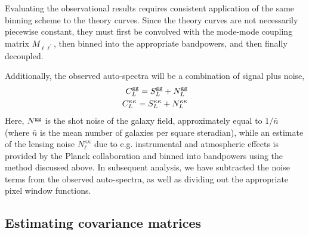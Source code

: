 Evaluating the observational results requires consistent application of the same binning scheme to the theory curves. Since the theory curves are not necessarily piecewise constant, they must first be convolved with the mode-mode coupling matrix $M_{\ell\ell^{\prime}}$, then binned into the appropriate bandpowers, and then finally decoupled.

Additionally, the observed auto-spectra will be a combination of signal plus noise,
\begin{align}
    C_{L}^{\rm gg} = S_{L}^{\rm gg} + N_{L}^{\rm gg} \\
    C_{L}^{\kappa \kappa} = S_{L}^{\kappa \kappa} + N_{L}^{\kappa \kappa}
\end{align}
Here, $N^{\rm gg}$ is the shot noise of the galaxy field, approximately equal to $1/\bar{n}$ (where $\bar{n}$ is the mean number of galaxies per square steradian), while an estimate of the lensing noise $N^{\kappa \kappa}_{\ell}$ due to e.g. instrumental and atmospheric effects is provided by the Planck collaboration and binned into bandpowers using the method discussed above. In subsequent analysis, we have subtracted the noise terms from the observed auto-spectra, as well as dividing out the appropriate pixel window functions.

\subsection{Estimating covariance matrices}

